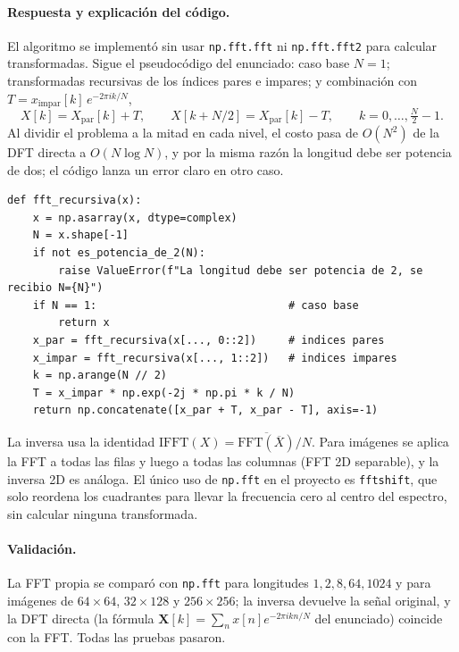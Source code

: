 \documentclass[11pt]{article}
\begin{document}
\paragraph{Respuesta y explicación del código.}
El algoritmo se implementó sin usar \texttt{np.fft.fft} ni \texttt{np.fft.fft2} para calcular transformadas.
Sigue el pseudocódigo del enunciado: caso base $N=1$; transformadas recursivas de los índices pares e impares;
y combinación con $T=x_{\text{impar}}[k]\,e^{-2\pi ik/N}$,
\begin{equation}
 X[k]=X_{\text{par}}[k]+T,\qquad X[k+N/2]=X_{\text{par}}[k]-T,\qquad k=0,\dots,\tfrac N2-1.
\end{equation}
Al dividir el problema a la mitad en cada nivel, el costo pasa de $O(N^2)$ de la DFT directa a $O(N\log N)$,
y por la misma razón la longitud debe ser potencia de dos; el código lanza un error claro en otro caso.

\begin{lstlisting}
def fft_recursiva(x):
    x = np.asarray(x, dtype=complex)
    N = x.shape[-1]
    if not es_potencia_de_2(N):
        raise ValueError(f"La longitud debe ser potencia de 2, se recibio N={N}")
    if N == 1:                              # caso base
        return x
    x_par = fft_recursiva(x[..., 0::2])     # indices pares
    x_impar = fft_recursiva(x[..., 1::2])   # indices impares
    k = np.arange(N // 2)
    T = x_impar * np.exp(-2j * np.pi * k / N)
    return np.concatenate([x_par + T, x_par - T], axis=-1)
\end{lstlisting}

La inversa usa la identidad $\mathrm{IFFT}(X)=\overline{\mathrm{FFT}(\overline{X})}/N$. Para imágenes se aplica la FFT
a todas las filas y luego a todas las columnas (FFT 2D separable), y la inversa 2D es análoga. El único uso de
\texttt{np.fft} en el proyecto es \texttt{fftshift}, que solo reordena los cuadrantes para llevar la frecuencia cero al
centro del espectro, sin calcular ninguna transformada.

\paragraph{Validación.}
La FFT propia se comparó con \texttt{np.fft} para longitudes $1,2,8,64,1024$ y para imágenes de
$64\times64$, $32\times128$ y $256\times256$; la inversa devuelve la señal original, y la DFT directa
(la fórmula $\mathbf X[k]=\sum_n x[n]e^{-2\pi ikn/N}$ del enunciado) coincide con la FFT. Todas las pruebas pasaron.
\end{document}
